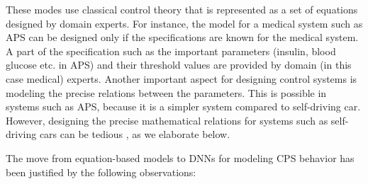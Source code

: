 These modes use classical control theory that is represented as a set of equations designed by domain experts.
For instance, the model for a medical system such as \ac{APS} can be designed only if the specifications are known for the medical system. 
A part of the specification such as the important parameters (insulin, blood glucose etc. in APS) and their threshold values are provided by domain (in this case medical) experts. 
Another important aspect for designing control systems is modeling the precise relations between the parameters. 
This is possible in systems such as APS, because it is a simpler system compared to self-driving car. 
However, designing the precise mathematical relations for systems such as self-driving cars can be tedious \cite{article23}, as we elaborate below.

The move from equation-based models to DNNs for modeling \ac{CPS} behavior has been justified by the following observations:
